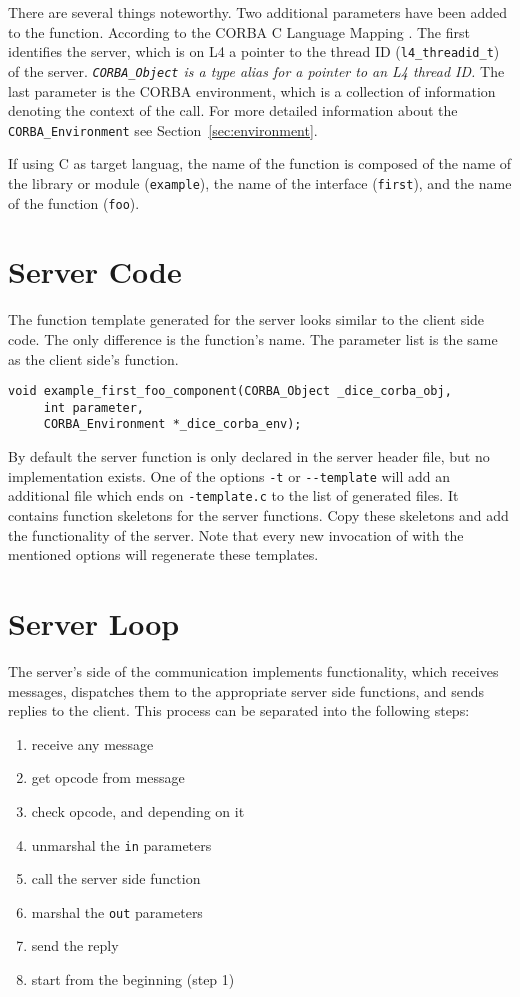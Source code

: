 There are several things noteworthy. Two additional parameters have been 
added to the function. According to the CORBA C Language
Mapping \cite{corba-clm}. The first identifies the server, which is on 
L4 a pointer to the thread ID (\verb|l4_threadid_t|) of the server.
{\em \verb|CORBA_Object| is a type alias for a pointer to an
L4 thread ID.}
The last parameter is the CORBA
environment, which is a collection of information denoting the
context of the call. For more detailed information about
the \verb|CORBA_Environment| see Section~\ref{sec:environment}.

If using C as target languag, the name of the function is composed of the 
name of the library or module (\verb|example|), the name of the
interface (\verb|first|), and the name of the function (\verb|foo|).

\section{Server Code}
The function template generated for the server looks similar to the client
side code. The only difference is the function's name. The 
parameter list is the same as the client side's function.

\begin{verbatim}
void example_first_foo_component(CORBA_Object _dice_corba_obj,
     int parameter,
     CORBA_Environment *_dice_corba_env);
\end{verbatim}

By default the server function is only declared in the server
header file, but no implementation exists. One of the options
\verb|-t| or \verb|--template| will 
add an additional file which ends on \verb|-template.c| to
the list of generated files. It contains function skeletons for the
server functions. Copy these skeletons and add the
functionality of the server. Note that every new invocation 
of \dice{} with the mentioned options will regenerate these
templates.

\section{Server Loop}
The server's side of the communication implements
functionality, which receives messages, dispatches them to the
appropriate server side functions, and sends replies
to the client. This process can be separated into the
following steps:

\begin{enumerate}
\item receive any message
\item get opcode from message
\item check opcode, and depending on it
\item unmarshal the \verb|in| parameters
\item call the server side function
\item marshal the \verb|out| parameters
\item send the reply
\item start from the beginning (step 1)
\end{enumerate}

